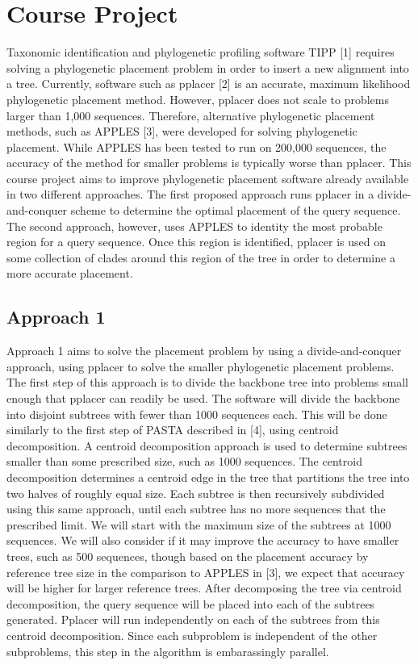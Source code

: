 \documentclass[11pt]{article}
\begin{document}
\section{Course Project}

Taxonomic identification and phylogenetic profiling software TIPP
{[}1{]} requires solving a phylogenetic placement problem in order to
insert a new alignment into a tree. Currently, software such as pplacer
{[}2{]} is an accurate, maximum likelihood phylogenetic placement
method. However, pplacer does not scale to problems larger than 1,000
sequences. Therefore, alternative phylogenetic placement methods, such
as APPLES {[}3{]}, were developed for solving phylogenetic placement.
While APPLES has been tested to run on 200,000 sequences, the accuracy
of the method for smaller problems is typically worse than pplacer. This
course project aims to improve phylogenetic placement software already
available in two different approaches. The first proposed approach runs
pplacer in a divide-and-conquer scheme to determine the optimal
placement of the query sequence. The second approach, however, uses
APPLES to identity the most probable region for a query sequence. Once
this region is identified, pplacer is used on some collection of clades
around this region of the tree in order to determine a more accurate
placement.

\subsection{Approach 1}

Approach 1 aims to solve the placement problem by using a
divide-and-conquer approach, using pplacer to solve the smaller
phylogenetic placement problems. The first step of this approach is to
divide the backbone tree into problems small enough that pplacer can
readily be used. The software will divide the backbone into disjoint
subtrees with fewer than 1000 sequences each. This will be done
similarly to the first step of PASTA described in {[}4{]}, using
centroid decomposition. A centroid decomposition approach is used to
determine subtrees smaller than some prescribed size, such as 1000
sequences. The centroid decomposition determines a centroid edge in the
tree that partitions the tree into two halves of roughly equal size.
Each subtree is then recursively subdivided using this same approach,
until each subtree has no more sequences that the prescribed limit. We
will start with the maximum size of the subtrees at 1000 sequences. We
will also consider if it may improve the accuracy to have smaller trees,
such as 500 sequences, though based on the placement accuracy by
reference tree size in the comparison to APPLES in {[}3{]}, we expect
that accuracy will be higher for larger reference trees. After
decomposing the tree via centroid decomposition, the query sequence will
be placed into each of the subtrees generated. Pplacer will run
independently on each of the subtrees from this centroid decomposition.
Since each subproblem is independent of the other subproblems, this step
in the algorithm is embarassingly parallel.
\end{document}
